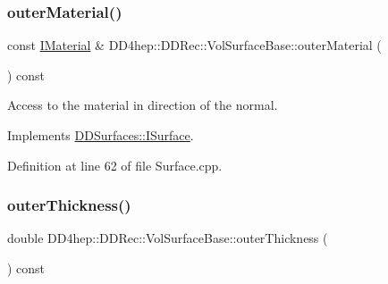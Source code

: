 \hypertarget{class_d_d4hep_1_1_d_d_rec_1_1_vol_surface_base_af05dcf58c48775e1a5a7b0acf59db1c0}{}\label{class_d_d4hep_1_1_d_d_rec_1_1_vol_surface_base_af05dcf58c48775e1a5a7b0acf59db1c0} 
\subsubsection{\texorpdfstring{outer\+Material()}{outerMaterial()}}
{\footnotesize\ttfamily const \hyperlink{class_d_d_surfaces_1_1_i_material}{I\+Material} \& D\+D4hep\+::\+D\+D\+Rec\+::\+Vol\+Surface\+Base\+::outer\+Material (\begin{DoxyParamCaption}{ }\end{DoxyParamCaption}) const\hspace{0.3cm}{\ttfamily [virtual]}}



Access to the material in direction of the normal. 



Implements \hyperlink{class_d_d_surfaces_1_1_i_surface_a49dfd8a5eef419226abc675b8d1126a5}{D\+D\+Surfaces\+::\+I\+Surface}.



Definition at line 62 of file Surface.\+cpp.

\hypertarget{class_d_d4hep_1_1_d_d_rec_1_1_vol_surface_base_a1a5c66bc7c13b15642720ea310b03f6f}{}\label{class_d_d4hep_1_1_d_d_rec_1_1_vol_surface_base_a1a5c66bc7c13b15642720ea310b03f6f} 
\subsubsection{\texorpdfstring{outer\+Thickness()}{outerThickness()}}
{\footnotesize\ttfamily double D\+D4hep\+::\+D\+D\+Rec\+::\+Vol\+Surface\+Base\+::outer\+Thickness (\begin{DoxyParamCaption}{ }\end{DoxyParamCaption}) const\hspace{0.3cm}{\ttfamily [virtual]}}

